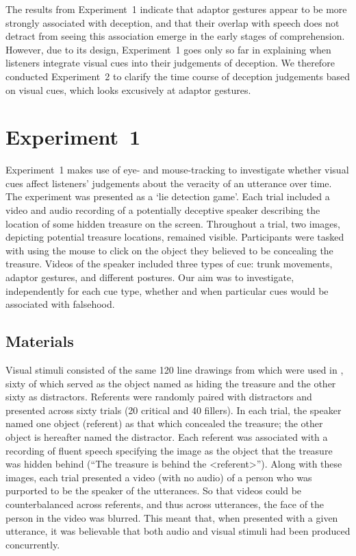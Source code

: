 \documentclass[a4paper,man,natbib]{apa6}
\begin{document}
The results from Experiment~1 indicate that adaptor gestures appear to be more strongly associated with deception, and that their overlap with speech does not detract from seeing this association emerge in the early stages of comprehension.
However, due to its design, Experiment~1 goes only so far in explaining when listeners integrate visual cues into their judgements of deception.
We therefore conducted Experiment~2 to clarify the time course of deception judgements based on visual cues, which looks excusively at adaptor gestures.


\section{Experiment~1}
Experiment~1 makes use of eye- and mouse-tracking to investigate whether visual cues affect listeners' judgements about the veracity of an utterance over time. 
The experiment was presented as a `lie detection game'.
Each trial included a video and audio recording of a potentially deceptive speaker describing the location of some hidden treasure on the screen.
Throughout a trial, two images, depicting potential treasure locations, remained visible. 
Participants were tasked with using the mouse to click on the object they believed to be concealing the treasure.
Videos of the speaker included three types of cue: trunk movements, adaptor gestures, and different postures.
Our aim was to investigate, independently for each cue type, whether and when particular cues would be associated with falsehood.


\subsection{Materials}
Visual stimuli consisted of the same 120 line drawings from \citet{Snodgrass1980} which were used in \citet{Loy2017}, sixty of which served as the object named as hiding the treasure and the other sixty as distractors.
Referents were randomly paired with distractors and presented across sixty trials (20 critical and 40 fillers). 
In each trial, the speaker named one object (referent) as that which concealed the treasure; the other object is hereafter named the distractor.
Each referent was associated with a recording of fluent speech specifying the image as the object that the treasure was hidden behind (``The treasure is behind the <referent>'').
Along with these images, each trial presented a video (with no audio) of a person who was purported to be the speaker of the utterances. 
So that videos could be counterbalanced across referents, and thus across utterances, the face of the person in the video was blurred. 
This meant that, when presented with a given utterance, it was believable that both audio and visual stimuli had been produced concurrently. 
\end{document}
